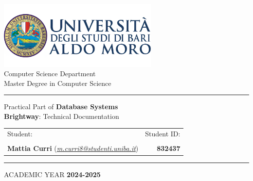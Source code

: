 
\begin{titlepage}
    \begin{center}
        \includegraphics[width=0.6\textwidth]{img/uniba_logo.png}\\
          \vspace{1cm}
          {\large Computer Science Department}\\
          \vspace{1cm}
          {\large Master Degree in Computer Science}\\
          \vspace{1cm}
          \hrule 
          \vspace{1.5cm}
          \vspace{0.5cm}
          {\large Practical Part of \textbf{Database Systems}}\\
          \vspace{1.5cm}
          {\LARGE \textbf{Brightway}: Technical Documentation}
          \\ %
          \vspace{1.2cm}

          \vfill
          
          \begin{tabularx}{\textwidth}{@{}Xr@{}}
              {\large Student:} & {\large Student ID:} \\  \\
              {\large \textbf{Mattia Curri} (\textit{\href{mailto:m.curri8@studenti.uniba.it}{m.curri8@studenti.uniba.it}})} & {\large \textbf{832437}} \\          \end{tabularx}    
          \vspace{1cm}
          \hrule
          \vspace{1cm}
          {\large ACADEMIC YEAR \textbf{2024{-}2025}}
    \end{center}
\end{titlepage}